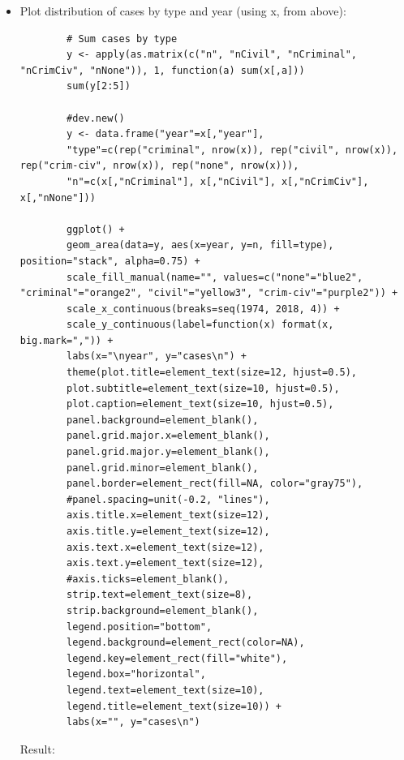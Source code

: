 \documentclass[10pt, letterpaper]{article}
\begin{document}
\begin{spacing}{1.0}
\begin{itemize}
    \item Plot distribution of cases by type and year (using x, from above):
    \scriptsize
    \begin{verbatim}
        # Sum cases by type
        y <- apply(as.matrix(c("n", "nCivil", "nCriminal", "nCrimCiv", "nNone")), 1, function(a) sum(x[,a]))
        sum(y[2:5])
        
        #dev.new()
        y <- data.frame("year"=x[,"year"],
        "type"=c(rep("criminal", nrow(x)), rep("civil", nrow(x)), rep("crim-civ", nrow(x)), rep("none", nrow(x))),
        "n"=c(x[,"nCriminal"], x[,"nCivil"], x[,"nCrimCiv"], x[,"nNone"]))
        
        ggplot() +
        geom_area(data=y, aes(x=year, y=n, fill=type), position="stack", alpha=0.75) +
        scale_fill_manual(name="", values=c("none"="blue2", "criminal"="orange2", "civil"="yellow3", "crim-civ"="purple2")) +
        scale_x_continuous(breaks=seq(1974, 2018, 4)) +
        scale_y_continuous(label=function(x) format(x, big.mark=",")) +
        labs(x="\nyear", y="cases\n") +
        theme(plot.title=element_text(size=12, hjust=0.5),
        plot.subtitle=element_text(size=10, hjust=0.5),
        plot.caption=element_text(size=10, hjust=0.5),
        panel.background=element_blank(),
        panel.grid.major.x=element_blank(),
        panel.grid.major.y=element_blank(),
        panel.grid.minor=element_blank(),
        panel.border=element_rect(fill=NA, color="gray75"),
        #panel.spacing=unit(-0.2, "lines"),
        axis.title.x=element_text(size=12),
        axis.title.y=element_text(size=12),
        axis.text.x=element_text(size=12),
        axis.text.y=element_text(size=12),
        #axis.ticks=element_blank(),
        strip.text=element_text(size=8),
        strip.background=element_blank(),
        legend.position="bottom",
        legend.background=element_rect(color=NA),
        legend.key=element_rect(fill="white"),
        legend.box="horizontal",
        legend.text=element_text(size=10),
        legend.title=element_text(size=10)) +
        labs(x="", y="cases\n")
    \end{verbatim}
    \normalsize
    \vspace{-8pt}
    Result:
    \small
    \begin{figure}[H]

\end{figure}
\end{itemize}
\end{spacing}
\end{document}
